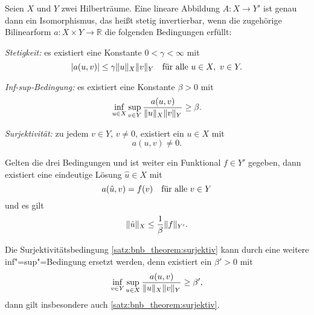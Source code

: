 \begin{Satz}
\label{satz:bnb_theorem}
    Seien $X$ und $Y$ zwei Hilberträume.
    Eine lineare Abbildung $A \colon X \to Y'$ ist genau dann ein Isomorphismus, das heißt stetig invertierbar, wenn die zugehörige Bilinearform $a \colon X \times Y \to \mathbb{R}$ die folgenden Bedingungen erfüllt:
    \begin{thmenumerate}
        \item \label{satz:bnb_theorem:stetig}
        \emph{Stetigkeit:}
        es existiert eine Konstante $0 < \gamma < \infty$ mit
        \begin{equation}
            \abs{a(u, v)} \leq \gamma \norm{u}_{X} \norm{v}_{Y} \quad \fa u \in X,~v\in Y.
        \end{equation}
        \item \label{satz:bnb_theorem:inf_sup_bedingung}
        \emph{Inf-sup-Bedingung:}
        es existiert eine Konstante $\beta > 0$ mit
        \begin{equation}
            \inf_{u \in X} \sup_{v \in Y} \frac{a(u, v)}{\norm{u}_{X} \norm{v}_{Y}} \geq \beta.
        \end{equation}
        \item \label{satz:bnb_theorem:surjektiv}
        \emph{Surjektivität:}
        zu jedem $v \in Y$, $v \neq 0$, existiert ein $u \in X$ mit
        \begin{equation}
            a(u, v) \neq 0.
        \end{equation}
    \end{thmenumerate}
    Gelten die drei Bedingungen und ist weiter ein Funktional $f \in Y'$ gegeben, dann existiert eine eindeutige Lösung $\hat u \in X$ mit
    \begin{equation}
        a(\hat u, v) = f(v) \quad \fa v \in Y
    \end{equation}
    und es gilt
    \begin{equation}
        \norm{\hat u}_{X} \leq \frac{1}{\beta} \norm{f}_{Y'}.
    \end{equation}
\end{Satz}

\begin{Bemerkung}
\label{bemerkung:bnb_theorem_inf_sup_statt_surjektiv}
    Die Surjektivitätsbedingung \cref{satz:bnb_theorem:surjektiv} kann durch eine weitere inf"=sup"=Bedingung ersetzt werden, denn existiert ein $\beta' > 0$ mit
    \begin{equation}
        \inf_{v \in Y} \sup_{u \in X} \frac{a(u, v)}{\norm{u}_{X} \norm{v}_{Y}} \geq \beta',
    \end{equation}
    dann gilt insbesondere auch \cref{satz:bnb_theorem:surjektiv}.
\end{Bemerkung}

